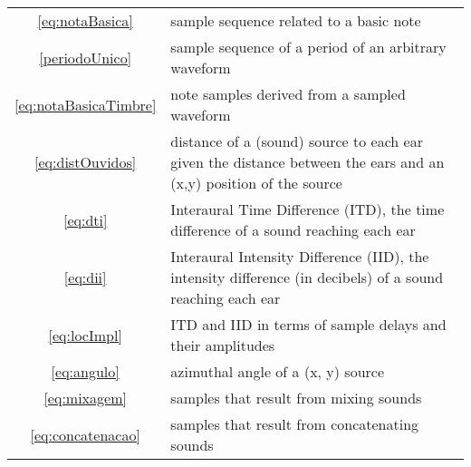 \documentclass{scrreprt}
\newcommand*{\reff}[1]{%
	{\NoHyper\ref{#1}\endNoHyper}%
	  }
\begin{document}
\begin{table*}[htp!]
\begin{tabular}{ c | p{12cm} }
 \reff{eq:notaBasica} & sample sequence related to a basic note \\
 \reff{periodoUnico} & sample sequence of a period of an arbitrary waveform \\
 \reff{eq:notaBasicaTimbre} & note samples derived from a sampled waveform \\
 \reff{eq:distOuvidos} & distance of a (sound) source to each ear given the distance between the ears and an (x,y) position of the source \\
 \reff{eq:dti} & Interaural Time Difference (ITD), the time difference of a sound reaching each ear \\
 \reff{eq:dii} & Interaural Intensity Difference (IID), the intensity difference (in decibels) of a sound reaching each ear \\
 \reff{eq:locImpl} & ITD and IID in terms of sample delays and their amplitudes \\
 \reff{eq:angulo} & azimuthal angle of a (x, y) source \\
 \reff{eq:mixagem} & samples that result from mixing sounds \\
 \reff{eq:concatenacao} & samples that result from concatenating sounds \\
\end{tabular}
\end{table*}
\end{document}
